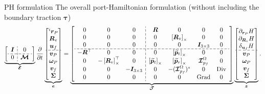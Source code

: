 \documentclass[aspectratio=169]{ISAE-Beamer}
\DeclareMathOperator*{\Grad}{Grad}
\DeclareMathOperator*{\Div}{Div}
\newcommand{\crmat}[1]{\ensuremath{\left[#1\right]_\times}}
\begin{document}
\begin{frame}{PH formulation}
The overall port-Hamiltonian formulation (without including the boundary traction $\bm{\tau}$)
\begin{equation*}
\setlength{\dashlinegap}{2pt}
\underbrace{
{\left[ \begin{array}{c:c}
	\bm{I} & 0 \\
	\hdashline
	0 & \bm{\mathcal{M}} \\
	\end{array} \right]}
}_{\bm{\mathcal{E}}}
\diffp{}{t}
\underbrace{\begin{bmatrix}
^i \bm{r}_P \\ \bm{R}_{\text{v}} \\ \bm{u}_f \\\hdashline  \bm{v}_P \\ \bm\omega_P  \\ \bm{v}_f  \\ \bm\Sigma \\
\end{bmatrix}}_{\bm{e}} = 
\underbrace{
{\left[ \begin{array}{ccc:cccc}
	0 & 0 & 0 &  \bm{R} & 0 & 0 & 0 \\
	0 & 0 & 0 & 0 & \crmat{\bm{R}_{\text{v}}} & 0 & 0 \\
	0 & 0 & 0 & 0 & 0 & \bm{I}_{3\times 3} & 0  \\ 
	\hdashline
	-\bm{R}^\top & 0 & 0 & 0 & \crmat{\widetilde{\bm{p}}_t} & 0 & 0 \\
	0 & -\crmat{\bm{R}_{\text{v}}}^\top & 0 & \crmat{\widetilde{\bm{p}}_t} & \crmat{\widetilde{\bm{p}}_r} & \bm{\mathcal{I}}_{p_f}^\Omega & 0 \\
	0 & 0 & -\bm{I}_{3\times 3} & 0 & -(\bm{\mathcal{I}}_{p_f}^\Omega)^* & 0 & \Div \\
	0 & 0 & 0 & 0 & 0 & \Grad & 0 \\
	\end{array} \right]}
}_{\bm{\mathcal{J}}}
\underbrace{\begin{bmatrix}
\partial_{\bm{r}_P}H \\ \partial_{\bm{R}_\text{v}}H \\ \delta_{\bm{u}_f} H \\\hdashline  \bm{v}_P \\ \bm\omega_P  \\ \bm{v}_f  \\ \bm\Sigma \\
\end{bmatrix}}_{\bm{z}}.
\end{equation*} 

\end{frame}
\end{document}
